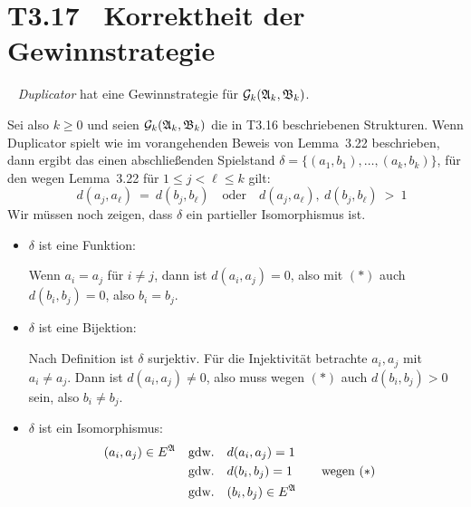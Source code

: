 \documentclass[fontsize=11pt, twoside=false, numbers=autoenddot]{scrbook}
\begin{document}
\pagebreak
\section*{T3.17~ Korrektheit der Gewinnstrategie}

~
\emph{Duplicator} hat eine Gewinnstrategie für $\mathcal{G}_k(\mathfrak{A}_k,\mathfrak{B}_k)$.
%
\begin{beweis}
  Sei also $k \geq 0$ und
  seien $\mathcal{G}_k(\mathfrak{A}_k,\mathfrak{B}_k)$ die in T3.16 beschriebenen Strukturen.
  Wenn Duplicator spielt wie im vorangehenden Beweis von Lemma~3.22 beschrieben,
  dann ergibt das einen abschließenden Spielstand
  $\delta = \{(a_1,b_1),\dots,(a_k,b_k)\}$,
  für den wegen Lemma~3.22 für $1 \leq j < \ell \leq k$ gilt:
  \[
    \tag{$*$}
    \quad d(a_j,a_\ell) ~=~ d(b_j,b_\ell)
    \quad\text{oder}\quad
    d(a_j,a_\ell),~d(b_j,b_\ell) ~>~ 1
  \]
  Wir müssen noch zeigen, dass $\delta$ ein partieller Isomorphismus ist.
  \begin{itemize}
    \item
      $\delta$ ist eine Funktion:
      \par
      Wenn $a_i = a_j$ für $i \neq j$,
      dann ist $d(a_i,a_j) = 0$,
      also mit $(*)$ auch $d (b_i,b_j) = 0$,
      also $b_i = b_j$.
      \par\smallskip
    \item
      $\delta$ ist eine Bijektion:
      \par
      Nach Definition ist $\delta$ surjektiv.
      Für die Injektivität betrachte $a_i,a_j$ mit $a_i \neq a_j$.
      Dann ist $d(a_i,a_j) \neq 0$,
      also muss wegen $(*)$ auch $d (b_i,b_j) > 0$ sein,
      also $b_i \neq b_j$.
      \par\smallskip
    \item
      $\delta$ ist ein Isomorphismus:
      \begin{alignat*}{2}
        (a_i,a_j) \in E^\mathfrak{A} & \text{~~~gdw.~~~} d(a_i,a_j) = 1 \\
                             & \text{~~~gdw.~~~} d(b_i,b_j) = 1 & & \quad\text{wegen $(*)$} \\
                             & \text{~~~gdw.~~~} (b_i,b_j) \in E^\mathfrak{A}
      \end{alignat*}
      \qedhere
  \end{itemize}
\end{beweis}%
\end{document}
